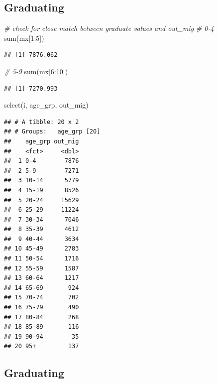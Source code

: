 \documentclass[
]{book}
\newenvironment{Shaded}{\begin{snugshade}}{\end{snugshade}}
\newcommand{\CommentTok}[1]{\textcolor[rgb]{0.56,0.35,0.01}{\textit{#1}}}
\newcommand{\DecValTok}[1]{\textcolor[rgb]{0.00,0.00,0.81}{#1}}
\newcommand{\FunctionTok}[1]{\textcolor[rgb]{0.00,0.00,0.00}{#1}}
\newcommand{\NormalTok}[1]{#1}
\newcommand{\SpecialCharTok}[1]{\textcolor[rgb]{0.00,0.00,0.00}{#1}}
\begin{document}
\hypertarget{graduating-3}{%
\subsection{Graduating}\label{graduating-3}}

\begin{Shaded}
\begin{Highlighting}[]
\CommentTok{\# check for close match between graduate values and out\_mig }
\CommentTok{\# 0{-}4}
\FunctionTok{sum}\NormalTok{(mx[}\DecValTok{1}\SpecialCharTok{:}\DecValTok{5}\NormalTok{])}
\end{Highlighting}
\end{Shaded}

\begin{verbatim}
## [1] 7876.062
\end{verbatim}

\begin{Shaded}
\begin{Highlighting}[]
\CommentTok{\# 5{-}9}
\FunctionTok{sum}\NormalTok{(mx[}\DecValTok{6}\SpecialCharTok{:}\DecValTok{10}\NormalTok{])}
\end{Highlighting}
\end{Shaded}

\begin{verbatim}
## [1] 7270.993
\end{verbatim}

\begin{Shaded}
\begin{Highlighting}[]
\FunctionTok{select}\NormalTok{(i, age\_grp, out\_mig)}
\end{Highlighting}
\end{Shaded}

\begin{verbatim}
## # A tibble: 20 x 2
## # Groups:   age_grp [20]
##    age_grp out_mig
##    <fct>     <dbl>
##  1 0-4        7876
##  2 5-9        7271
##  3 10-14      5779
##  4 15-19      8526
##  5 20-24     15629
##  6 25-29     11224
##  7 30-34      7046
##  8 35-39      4612
##  9 40-44      3634
## 10 45-49      2783
## 11 50-54      1716
## 12 55-59      1587
## 13 60-64      1217
## 14 65-69       924
## 15 70-74       702
## 16 75-79       490
## 17 80-84       268
## 18 85-89       116
## 19 90-94        35
## 20 95+         137
\end{verbatim}

\hypertarget{graduating-4}{%
\subsection{Graduating}\label{graduating-4}}
\end{document}
